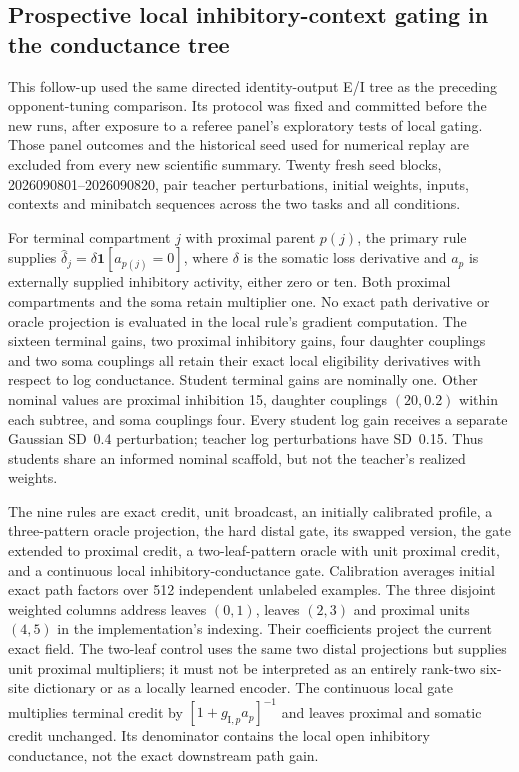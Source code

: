 \subsection{Prospective local inhibitory-context gating in the conductance tree}
\label{note:conductance_local_gate}

This follow-up used the same directed identity-output E/I tree as the preceding opponent-tuning comparison. Its protocol was fixed and committed before the new runs, after exposure to a referee panel's exploratory tests of local gating. Those panel outcomes and the historical seed used for numerical replay are excluded from every new scientific summary. Twenty fresh seed blocks, 2026090801--2026090820, pair teacher perturbations, initial weights, inputs, contexts and minibatch sequences across the two tasks and all conditions.

For terminal compartment $j$ with proximal parent $p(j)$, the primary rule supplies $\widehat\delta_j=\delta\mathbf1[a_{p(j)}=0]$, where $\delta$ is the somatic loss derivative and $a_p$ is externally supplied inhibitory activity, either zero or ten. Both proximal compartments and the soma retain multiplier one. No exact path derivative or oracle projection is evaluated in the local rule's gradient computation. The sixteen terminal gains, two proximal inhibitory gains, four daughter couplings and two soma couplings all retain their exact local eligibility derivatives with respect to log conductance. Student terminal gains are nominally one. Other nominal values are proximal inhibition 15, daughter couplings $(20,0.2)$ within each subtree, and soma couplings four. Every student log gain receives a separate Gaussian SD~0.4 perturbation; teacher log perturbations have SD~0.15. Thus students share an informed nominal scaffold, but not the teacher's realized weights.

The nine rules are exact credit, unit broadcast, an initially calibrated profile, a three-pattern oracle projection, the hard distal gate, its swapped version, the gate extended to proximal credit, a two-leaf-pattern oracle with unit proximal credit, and a continuous local inhibitory-conductance gate. Calibration averages initial exact path factors over 512 independent unlabeled examples. The three disjoint weighted columns address leaves $(0,1)$, leaves $(2,3)$ and proximal units $(4,5)$ in the implementation's indexing. Their coefficients project the current exact field. The two-leaf control uses the same two distal projections but supplies unit proximal multipliers; it must not be interpreted as an entirely rank-two six-site dictionary or as a locally learned encoder. The continuous local gate multiplies terminal credit by $[1+g_{\mathrm I,p}a_p]^{-1}$ and leaves proximal and somatic credit unchanged. Its denominator contains the local open inhibitory conductance, not the exact downstream path gain.

